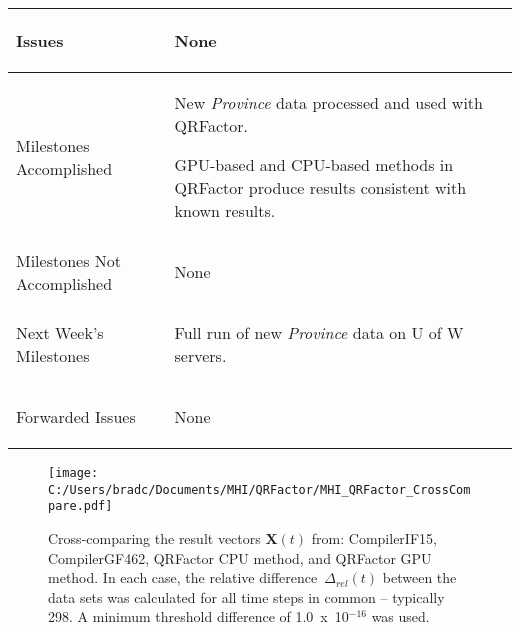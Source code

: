 \documentclass[11pt,letterpaper]{article}
\newcommand{\its}{\item[\tiny\textbullet]}
\begin{document}
\begin{tabular}{| p{} | p{} |}
	Issues & \begin{enumerate*}
	\item[\tiny\textbullet] None
	\end{enumerate*} \\ \hline

	Milestones \newline Accomplished & \begin{enumerate*}
	\item[\tiny\textbullet] New \emph{Province} data processed and used with QRFactor. \newline
  \its GPU-based and CPU-based methods in QRFactor produce results consistent with known results.
  \end{enumerate*} \\ \hline

	Milestones Not \newline Accomplished & \begin{enumerate*}
	\item[\tiny\textbullet] None
	\end{enumerate*} \\ \hline

	Next Week's \newline Milestones & \begin{enumerate*}
  \item[\tiny\textbullet] Full run of new \emph{Province} data on U of W servers.
	\end{enumerate*} \\ \hline

	Forwarded Issues & \begin{enumerate*}
	\item[\tiny\textbullet] None
	\end{enumerate*} \\ \hline
\end{tabular}

\begin{figure}[!ht]
    \centering
    \texttt{[image: C:/Users/bradc/Documents/MHI/QRFactor/MHI\_QRFactor\_CrossCompare.pdf]}
    \caption{Cross-comparing the result vectors $\mathbf{X}(t)$ from: CompilerIF15, CompilerGF462,
    QRFactor CPU method, and QRFactor GPU method. In each case, the relative difference~$\Delta_{rel}(t)$
    between the data sets was calculated for all time steps in common -- typically 298. A
    minimum threshold difference of 1.0~x~10$^{-16}$ was used.}
    \label{f:cpuvsgpu}
\end{figure}
\end{document}
